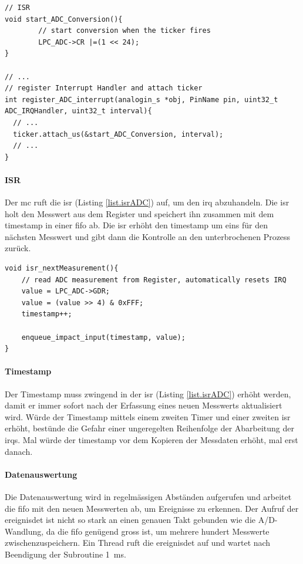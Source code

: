 \begin{lstlisting}[caption=Timer mit Aufruf der A/D-Wandler-Funktion (ADC\_4088.cpp), label=list.tickerADC]
// ISR 
void start_ADC_Conversion(){
		// start conversion when the ticker fires
		LPC_ADC->CR |=(1 << 24);
}

// ...
// register Interrupt Handler and attach ticker
int register_ADC_interrupt(analogin_s *obj, PinName pin, uint32_t ADC_IRQHandler, uint32_t interval){
  // ...
  ticker.attach_us(&start_ADC_Conversion, interval);
  // ...
}
\end{lstlisting}

\paragraph{ISR} Der \gls{mc} ruft die \gls{isr} (Listing \ref{list.isrADC}) auf, um den \gls{irq} abzuhandeln. Die \gls{isr} holt den Messwert aus dem Register und speichert ihn zusammen mit dem \gls{timestamp} in einer \gls{fifo} ab. Die \gls{isr} erhöht den \gls{timestamp} um eins für den nächsten Messwert und gibt dann die Kontrolle an den unterbrochenen Prozess zurück.

\begin{lstlisting}[caption=ISR zur Abhandlung des ADC-Interrupt Requests (impact\_event.cpp), label=list.isrADC]
void isr_nextMeasurement(){
	// read ADC measurement from Register, automatically resets IRQ
	value = LPC_ADC->GDR;
	value = (value >> 4) & 0xFFF;
	timestamp++;
	
	enqueue_impact_input(timestamp, value);
}
\end{lstlisting}

\paragraph{Timestamp} Der Timestamp muss zwingend in der \gls{isr} (Listing \ref{list.isrADC}) erhöht werden, damit er immer sofort nach der Erfassung eines neuen Messwerts aktualisiert wird. Würde der Timestamp mittels einem zweiten Timer und einer zweiten \gls{isr} erhöht, bestünde die Gefahr einer ungeregelten Reihenfolge der Abarbeitung der \gls{irq}s. Mal würde der \gls{timestamp} vor dem Kopieren der Messdaten erhöht, mal erst danach.

\paragraph{Datenauswertung} Die Datenauswertung wird in regelmässigen Abständen aufgerufen und arbeitet die \gls{fifo} mit den neuen Messwerten ab, um Ereignisse zu erkennen. Der Aufruf der \gls{ereignisdet} ist nicht so stark an einen genauen Takt gebunden wie die A/D-Wandlung, da die \gls{fifo} genügend gross ist, um mehrere hundert Messwerte zwischenzuspeichern. Ein Thread ruft die \gls{ereignisdet} auf und wartet nach Beendigung der Subroutine 1~ms.

